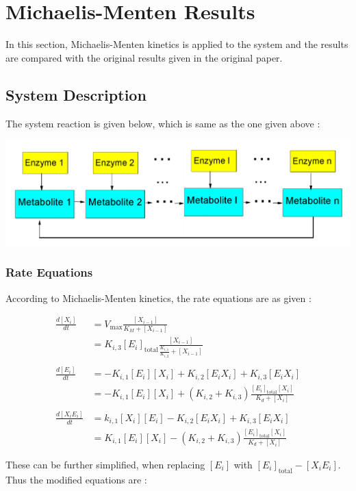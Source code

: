 \chapter*{Michaelis-Menten Results}
In this section, Michaelis-Menten kinetics is applied to 
the system and the results are compared with the original 
results given in the original paper.

\section*{System Description}
The system reaction is given below, which is same as the one 
given above :

\begin{center}
    \includegraphics[scale=0.3]{img/orig-sys.png}
\end{center}

\subsection*{Rate Equations}
According to Michaelis-Menten kinetics, the rate equations 
are as given :

\begin{align*}
    \frac{d[X_i]}{dt} &= V_{\text{max}} \frac{[X_{i-1}]}{K_M + [X_{i-1}]}\\
    &= K_{i,3}[E_i]_{\text{total}} \frac{[X_{i-1}]}{\frac{K_{i,1}}{K_{i,2}} + [X_{i-1}]}\\\\
    \frac{d[E_i]}{dt} &= -K_{i,1}[E_i][X_i] + K_{i,2}[E_iX_i] + K_{i,3}[E_iX_i]\\
    &= -K_{i,1}[E_i][X_i] + (K_{i,2} + K_{i,3})\frac{[E_i]_{\text{total}}[X_i]}{K_d + [X_i]}\\\\
    \frac{d[X_iE_i]}{dt} &= k_{i,1}[X_i][E_i] - K_{i,2}[E_iX_i] + K_{i,3}[E_iX_i]\\
    &= K_{i,1}[E_i][X_i] - (K_{i,2} + K_{i,3})\frac{[E_i]_{\text{total}}[X_i]}{K_d + [X_i]}
\end{align*}

\noindent These can be further simplified, when replacing 
$[E_i]$ with $[E_i]_{\text{total}} - [X_iE_i]$. Thus the 
modified equations are :

